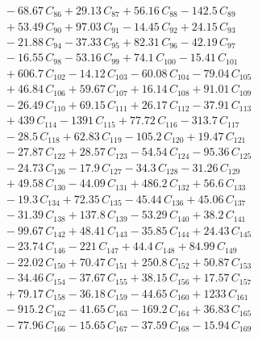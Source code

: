 \documentclass[a4paper,11pt]{article}
\begin{document}
\begin{align}
&\quad - 68.67\,C_{86} + 29.13\,C_{87} + 56.16\,C_{88} - 142.5\,C_{89} \nonumber\\
&\quad + 53.49\,C_{90} + 97.03\,C_{91} - 14.45\,C_{92} + 24.15\,C_{93} \nonumber\\
&\quad - 21.88\,C_{94} - 37.33\,C_{95} + 82.31\,C_{96} - 42.19\,C_{97} \nonumber\\
&\quad - 16.55\,C_{98} - 53.16\,C_{99} + 74.1\,C_{100} - 15.41\,C_{101} \nonumber\\
&\quad + 606.7\,C_{102} - 14.12\,C_{103} - 60.08\,C_{104} - 79.04\,C_{105} \nonumber\\
&\quad + 46.84\,C_{106} + 59.67\,C_{107} + 16.14\,C_{108} + 91.01\,C_{109} \nonumber\\
&\quad - 26.49\,C_{110} + 69.15\,C_{111} + 26.17\,C_{112} - 37.91\,C_{113} \nonumber\\
&\quad + 439\,C_{114} - 1391\,C_{115} + 77.72\,C_{116} - 313.7\,C_{117} \nonumber\\
&\quad - 28.5\,C_{118} + 62.83\,C_{119} - 105.2\,C_{120} + 19.47\,C_{121} \nonumber\\
&\quad - 27.87\,C_{122} + 28.57\,C_{123} - 54.54\,C_{124} - 95.36\,C_{125} \nonumber\\
&\quad - 24.73\,C_{126} - 17.9\,C_{127} - 34.3\,C_{128} - 31.26\,C_{129} \nonumber\\
&\quad + 49.58\,C_{130} - 44.09\,C_{131} + 486.2\,C_{132} + 56.6\,C_{133} \nonumber\\
&\quad - 19.3\,C_{134} + 72.35\,C_{135} - 45.44\,C_{136} + 45.06\,C_{137} \nonumber\\
&\quad - 31.39\,C_{138} + 137.8\,C_{139} - 53.29\,C_{140} + 38.2\,C_{141} \nonumber\\
&\quad - 99.67\,C_{142} + 48.41\,C_{143} - 35.85\,C_{144} + 24.43\,C_{145} \nonumber\\
&\quad - 23.74\,C_{146} - 221\,C_{147} + 44.4\,C_{148} + 84.99\,C_{149} \nonumber\\
&\quad - 22.02\,C_{150} + 70.47\,C_{151} + 250.8\,C_{152} + 50.87\,C_{153} \nonumber\\
&\quad - 34.46\,C_{154} - 37.67\,C_{155} + 38.15\,C_{156} + 17.57\,C_{157} \nonumber\\
&\quad + 79.17\,C_{158} - 36.18\,C_{159} - 44.65\,C_{160} + 1233\,C_{161} \nonumber\\
&\quad - 915.2\,C_{162} - 41.65\,C_{163} - 169.2\,C_{164} + 36.83\,C_{165} \nonumber\\
&\quad - 77.96\,C_{166} - 15.65\,C_{167} - 37.59\,C_{168} - 15.94\,C_{169} \nonumber\\

\end{align}
\end{document}
